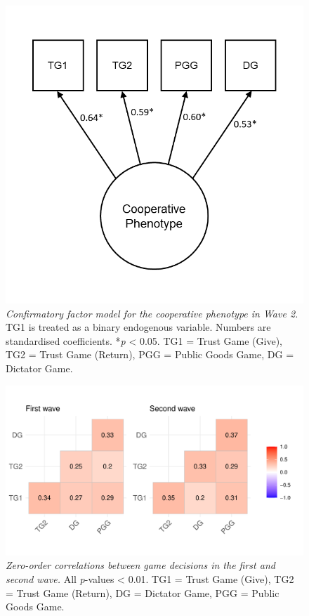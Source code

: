 \documentclass[
  man,floatsintext]{apa6}
\begin{document}
\newpage






\begin{figure}
\includegraphics[width=0.8\linewidth]{images/cfa1} \caption{\emph{Confirmatory factor model for the cooperative
phenotype in Wave 2.} TG1 is treated as a binary endogenous variable. Numbers
are standardised coefficients. *\emph{p} \textless{} 0.05. TG1 = Trust Game (Give), TG2 = Trust
Game (Return), PGG = Public Goods Game, DG = Dictator Game.}\label{fig:cfa1Plot}
\end{figure}

\newpage





\begin{figure}
\centering
\includegraphics{manuscript_files/figure-latex/plotCors-1.pdf}
\caption{\label{fig:plotCors}\emph{Zero-order correlations between game decisions in the
first and second wave.} All \emph{p}-values \textless{} 0.01. TG1 = Trust Game (Give), TG2 =
Trust Game (Return), DG = Dictator Game, PGG = Public Goods Game.}
\end{figure}
\end{document}
